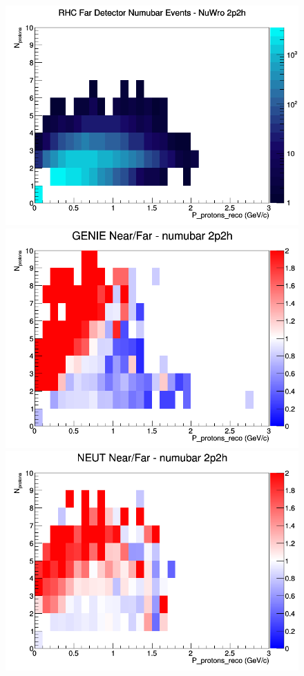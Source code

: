\begin{figure}[h]
\endminipage
{}
\includegraphics[width=\linewidth]{eff_N_P/GAr/protons/2p2h_RHC_FD_numubar_N_P_NuWro.png}
\endminipage
\newline
{}
\includegraphics[width=\linewidth]{eff_N_P/GAr/protons/ratios/2p2h_GENIE_numubar_NF_N_P.png}
\endminipage
{}
\includegraphics[width=\linewidth]{eff_N_P/GAr/protons/ratios/2p2h_NEUT_numubar_NF_N_P.png}

\end{figure}
